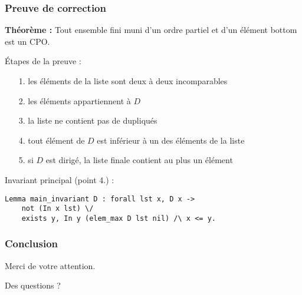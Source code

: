\documentclass{beamer}
\begin{document}
\begin{frame}
{\begin{figure}[ht]
{
	}
\end{figure}
}

   
\end{frame}

\begin{frame}[fragile]
\frametitle{Preuve de correction}

\textbf{Théorème :} Tout ensemble fini muni d'un ordre partiel et d'un élément bottom est un CPO.

\medskip

Étapes de la preuve :

\begin{itemize}
\item[1.] les éléments de la liste sont deux à deux incomparables
\item[2.] les éléments appartiennent à $D$
\item[3.] la liste ne contient pas de dupliqués
\item[4.] tout élément de $D$ est inférieur à un des éléments de la liste 
\item[5.] si $D$ est dirigé, la liste finale contient au plus un élément
\end{itemize}

\medskip

Invariant principal (point 4.) :

\begin{lstlisting}[frame=single, language = Coq, basicstyle=\scriptsize]
Lemma main_invariant D : forall lst x, D x -> 
	not (In x lst) \/ 
	exists y, In y (elem_max D lst nil) /\ x <= y.
\end{lstlisting}

\end{frame}



\begin{frame}
\frametitle{Conclusion}


\centering
Merci de votre attention.

\bigskip

Des questions ?

\end{frame}
\end{document}
